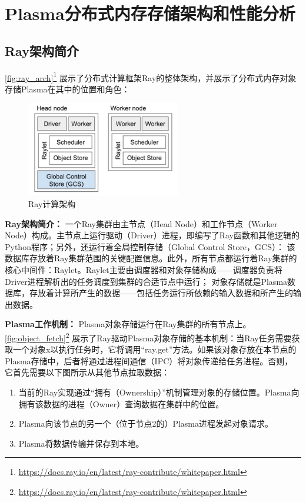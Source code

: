 \chapter{Plasma分布式内存存储架构和性能分析}

\section{Ray架构简介}

\autoref{fig:ray_arch}\footnote{\url{https://docs.ray.io/en/latest/ray-contribute/whitepaper.html}}
展示了分布式计算框架Ray的整体架构，并展示了分布式内存对象存储Plasma在其中的位置和角色：

\begin{figure}[h] 
    \centering
    \includegraphics[width=0.6\textwidth]{image/chap02/ray_arch.png}
    \caption{Ray计算架构}
    \label{fig:ray_arch}
\end{figure}

\textbf{Ray架构简介：}
一个Ray集群由主节点（Head Node）和工作节点（Worker Node）构成。主节点上运行驱动（Driver）进程，即编写了Ray函数和其他逻辑的Python程序；另外，还运行着全局控制存储（Global Control Store，GCS）：
该数据库存放着Ray集群范围的关键配置信息。此外，所有节点都运行着Ray集群的核心中间件：Raylet。Raylet主要由调度器和对象存储构成——调度器负责将Driver进程解析出的任务调度到集群的合适节点中运行；
对象存储就是Plasma数据库，存放着计算所产生的数据——包括任务运行所依赖的输入数据和所产生的输出数据。

\textbf{Plasma工作机制：}
Plasma对象存储运行在Ray集群的所有节点上。\autoref{fig:object_fetch}\footnote{\url{https://docs.ray.io/en/latest/ray-contribute/whitepaper.html}}
展示了Ray驱动Plasma对象存储的基本机制：当Ray任务需要获取一个对象x以执行任务时，它将调用“ray.get”方法。如果该对象存放在本节点的Plasma存储中，后者将通过进程间通信（IPC）将对象传递给任务进程。否则，
它首先需要以下图所示从其他节点拉取数据：

\begin{enumerate}
    \item 当前的Ray实现通过“拥有（Ownership）”机制管理对象的存储位置。Plasma向拥有该数据的进程（Owner）查询数据在集群中的位置。
    \item Plasma向该节点的另一个（位于节点2的）Plasma进程发起对象请求。
    \item Plasma将数据传输并保存到本地。
\end{enumerate}

